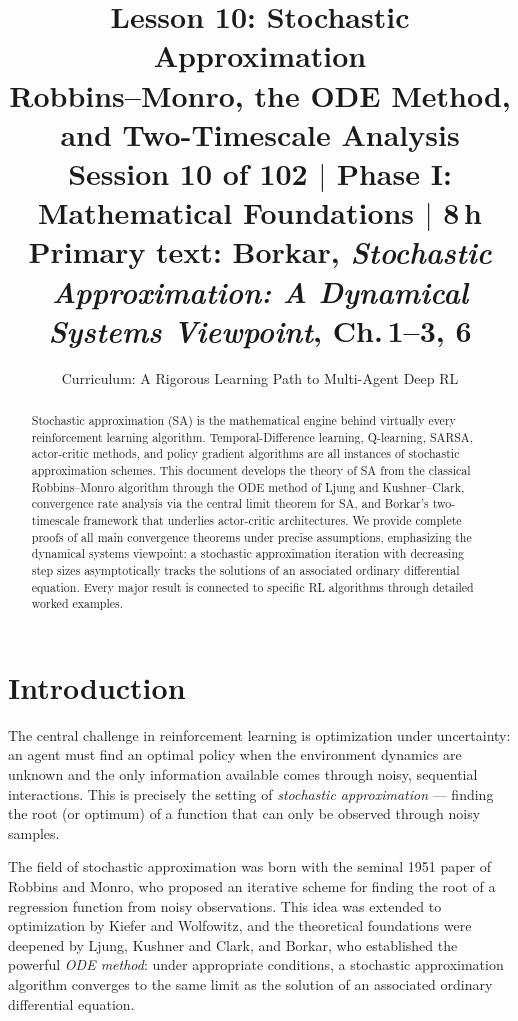 \documentclass[11pt,a4paper]{article}
\title{\textbf{Lesson 10: Stochastic Approximation}\\[10pt]
\large Robbins--Monro, the ODE Method, and Two-Timescale Analysis\\[5pt]
\normalsize Session 10 of 102 $\mid$ Phase I: Mathematical Foundations $\mid$ 8\,h\\
\normalsize Primary text: Borkar, \emph{Stochastic Approximation: A Dynamical Systems Viewpoint}, Ch.\,1--3, 6}
\author{Curriculum: A Rigorous Learning Path to Multi-Agent Deep RL}
\date{}
\theoremstyle{definition}
\theoremstyle{plain}
\theoremstyle{remark}
\begin{document}
\maketitle

\begin{abstract}
Stochastic approximation (SA) is the mathematical engine behind virtually every
reinforcement learning algorithm. Temporal-Difference learning, Q-learning, SARSA,
actor-critic methods, and policy gradient algorithms are all instances of stochastic
approximation schemes. This document develops the theory of SA from the classical
Robbins--Monro algorithm through the ODE method of Ljung and Kushner--Clark, convergence
rate analysis via the central limit theorem for SA, and Borkar's two-timescale framework
that underlies actor-critic architectures. We provide complete proofs of all main
convergence theorems under precise assumptions, emphasizing the dynamical systems
viewpoint: a stochastic approximation iteration with decreasing step sizes asymptotically
tracks the solutions of an associated ordinary differential equation. Every major result
is connected to specific RL algorithms through detailed worked examples.
\end{abstract}

\tableofcontents
\newpage

\section{Introduction}
\label{sec:intro}

The central challenge in reinforcement learning is optimization under uncertainty: an
agent must find an optimal policy when the environment dynamics are unknown and the only
information available comes through noisy, sequential interactions. This is precisely the
setting of \emph{stochastic approximation} --- finding the root (or optimum) of a
function that can only be observed through noisy samples.

The field of stochastic approximation was born with the seminal 1951 paper of Robbins
and Monro, who proposed an iterative scheme for finding the root of a regression
function from noisy observations. This idea was extended to optimization by Kiefer and
Wolfowitz, and the theoretical foundations were deepened by Ljung, Kushner and Clark,
and Borkar, who established the powerful \emph{ODE method}: under appropriate conditions,
a stochastic approximation algorithm converges to the same limit as the solution of an
associated ordinary differential equation.
\end{document}
